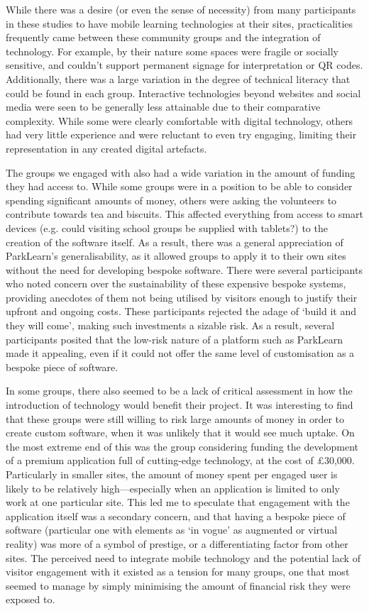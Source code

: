 While there was a desire (or even the sense of necessity) from many participants in these studies to have mobile learning technologies at their sites, practicalities frequently came between these community groups and the integration of technology. For example, by their nature some spaces were fragile or socially sensitive, and couldn't support permanent signage for interpretation or QR codes. Additionally, there was a large variation in the degree of technical literacy that could be found in each group. Interactive technologies beyond websites and social media were seen to be generally less attainable due to their comparative complexity. While some were clearly comfortable with digital technology, others had very
little experience and were reluctant to even try engaging, limiting their representation in any created digital artefacts.

The groups we engaged with also had a wide variation in the amount of funding they had access to. While some groups were in a position to be able to consider spending significant amounts of money, others were asking the volunteers to contribute towards tea and biscuits. This affected everything from access to smart devices (e.g. could visiting school groups be supplied with tablets?) to the creation of the software itself. As a result, there was a general appreciation of ParkLearn's generalisability, as it allowed groups to apply it to their own sites without the need for developing bespoke software. There were several participants who noted concern over the sustainability of these expensive bespoke systems, providing anecdotes of them not being utilised by visitors enough to justify their upfront and ongoing costs. These participants rejected the adage of `build it and they will come', making such investments a sizable risk. As a result, several participants posited that the low-risk nature of a platform such as ParkLearn made it appealing, even if it could not offer the same level of customisation as a bespoke piece of software.

In some groups, there also seemed to be a lack of critical assessment in how the introduction of technology would benefit their project. It was interesting to find that these groups were still willing to risk large amounts of money in order to create custom software, when it was unlikely that it would see much uptake. On the most extreme end of this was the group considering funding the development of a premium application full of cutting-edge technology, at the cost of £30,000. Particularly in smaller sites, the amount of money spent per engaged user is likely to be relatively high---especially when an application is limited to only work at one particular site. This led me to speculate that engagement with the application itself was a secondary concern, and that having a bespoke piece of software (particular one with elements as `in vogue' as augmented or virtual reality) was more of a symbol of prestige, or a differentiating factor from other sites. The perceived need to integrate mobile technology and the potential lack of visitor engagement with it existed as a tension for many groups, one that most seemed to manage by simply minimising the amount of financial risk they were exposed to.

